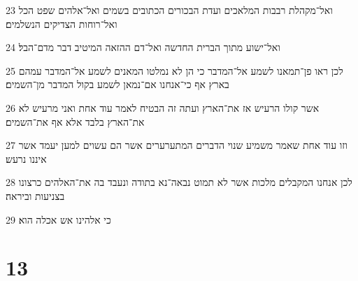 \par 23 ואל־מקהלת רבבות המלאכים ועדת הבכורים הכתובים בשמים ואל־אלהים שפט הכל ואל־רוחות הצדיקים הנשלמים׃
\par 24 ואל־ישוע מתוך הברית החדשה ואל־דם ההזאה המיטיב דבר מדם־הבל׃
\par 25 לכן ראו פן־תמאנו לשמע אל־המדבר כי הן לא נמלטו המאנים לשמע אל־המדבר עמהם בארץ אף כי־אנחנו אם־נמאן לשמע בקול המדבר מן־השמים׃
\par 26 אשר קולו הרעיש אז את־הארץ ועתה זה הבטיח לאמר עוד אחת ואני מרעיש לא את־הארץ בלבד אלא אף את־השמים׃
\par 27 וזו עוד אחת שאמר משמיע שנוי הדברים המתערערים אשר הם עשוים למען יעמד אשר איננו נרעש׃
\par 28 לכן אנחנו המקבלים מלכות אשר לא תמוט נבאה־נא בתודה ונעבד בה את־האלהים כרצונו בצניעות וביראה׃
\par 29 כי אלהינו אש אכלה הוא׃

\chapter{13}

